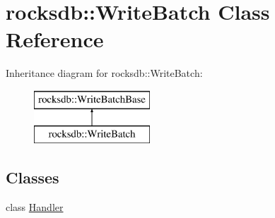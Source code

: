\hypertarget{classrocksdb_1_1WriteBatch}{}\section{rocksdb\+:\+:Write\+Batch Class Reference}
\label{classrocksdb_1_1WriteBatch}
Inheritance diagram for rocksdb\+:\+:Write\+Batch\+:\begin{figure}[H]
\begin{center}
\leavevmode
\includegraphics[height=2.000000cm]{classrocksdb_1_1WriteBatch}
\end{center}
\end{figure}
\subsection*{Classes}
\begin{DoxyCompactItemize}
\item 
class \hyperlink{classrocksdb_1_1WriteBatch_1_1Handler}{Handler}
\end{DoxyCompactItemize}
